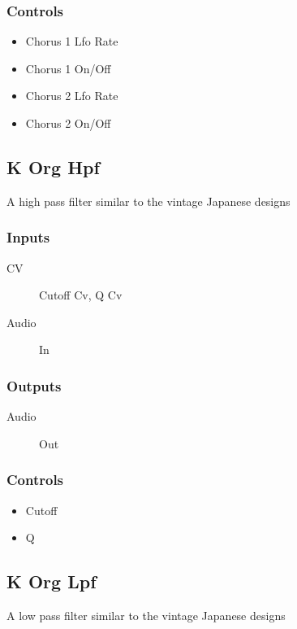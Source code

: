 \subsubsection{Controls}
\begin{itemize}
\item Chorus 1 Lfo Rate
\item Chorus 1 On/Off
\item Chorus 2 Lfo Rate
\item Chorus 2 On/Off
\end{itemize}

\subsection{K Org Hpf}

A high pass filter similar to the vintage Japanese designs



\subsubsection{Inputs}
\begin{description}
\item [CV] Cutoff Cv, Q Cv
\item [Audio] In
\end{description}

\subsubsection{Outputs}
\begin{description}
\item [Audio] Out
\end{description}

\subsubsection{Controls}
\begin{itemize}
\item Cutoff
\item Q
\end{itemize}

\subsection{K Org Lpf}

A low pass filter similar to the vintage Japanese designs




